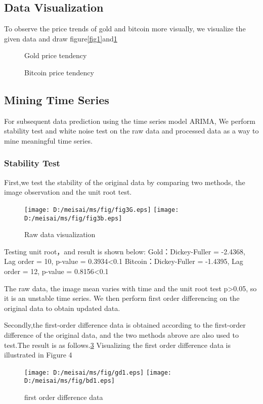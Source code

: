 \documentclass{mcmthesis}
\begin{document}
\subsection{Data Visualization}
To observe the price trends of gold and bitcoin more visually,
we visualize the given data and draw figure\ref{fig1}and\ref{fig2}
\begin{figure}[h]
  \centering
  \caption{Gold price tendency} \label{fig1}
  \centering
  \caption{Bitcoin price tendency} \label{fig2}
  \end{figure}


\subsection{Mining Time Series}
For subsequent data prediction using the time series model ARIMA,
We perform stability test and white noise test on the raw data and processed data as a way to mine meaningful time series.


\subsubsection{Stability Test}
First,we test the stability of the original data by comparing two methods, the image observation and the unit root test.
\begin{figure}[!hb]
  \centering 
  \texttt{[image: D:/meisai/ms/fig/fig3G.eps]}
  \texttt{[image: D:/meisai/ms/fig/fig3b.eps]}
  \caption{Raw data visualization} \label{fig3}
\end{figure}
Testing unit root，and result is shown below:
Gold：Dickey-Fuller = -2.4368, Lag order = 10, p-value = 0.3934<0.1
Bitcoin：Dickey-Fuller = -1.4395, Lag order = 12, p-value = 0.8156<0.1

The raw data, the image mean varies with time and the unit root test p>0.05, so it is an unstable time series.
We then perform first order differencing on the original data to obtain updated data.


Secondly,the first-order difference data is obtained according to the first-order difference of the original data, 
and the two methods abrove are also used to test.The result is as follows.\ref{fig4}
Visualizing the first order difference data is illustrated in Figure 4
\begin{figure}[!hb]
  \centering 
  \texttt{[image: D:/meisai/ms/fig/gd1.eps]}
  \texttt{[image: D:/meisai/ms/fig/bd1.eps]}
  \caption{first order difference data} \label{fig4}
\end{figure}
\end{document}
